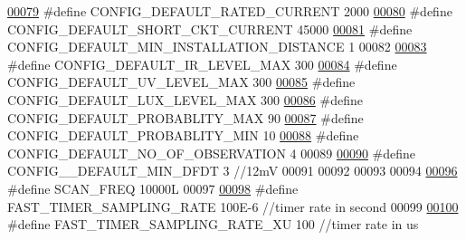\begin{DoxyCode}
\hypertarget{a00021_source_l00079}{}\hyperlink{a00021_ae329eb408f386777cbb443c27ca7c1c5}{00079} \textcolor{preprocessor}{#define CONFIG\_DEFAULT\_RATED\_CURRENT                            2000}
\hypertarget{a00021_source_l00080}{}\hyperlink{a00021_a9b142f2e7d26511af74c411c0e524384}{00080} \textcolor{preprocessor}{#define CONFIG\_DEFAULT\_SHORT\_CKT\_CURRENT                        45000}
\hypertarget{a00021_source_l00081}{}\hyperlink{a00021_aad4ef21bb535ed8bbba5a4f2d0451711}{00081} \textcolor{preprocessor}{#define CONFIG\_DEFAULT\_MIN\_INSTALLATION\_DISTANCE                1}
00082 
\hypertarget{a00021_source_l00083}{}\hyperlink{a00021_adf882de105367de21f0cbfe4490a046f}{00083} \textcolor{preprocessor}{#define CONFIG\_DEFAULT\_IR\_LEVEL\_MAX                             300}
\hypertarget{a00021_source_l00084}{}\hyperlink{a00021_a29f761c18bae89d087200e4f1891c651}{00084} \textcolor{preprocessor}{#define CONFIG\_DEFAULT\_UV\_LEVEL\_MAX                             300}
\hypertarget{a00021_source_l00085}{}\hyperlink{a00021_a04ab25767fbb61ec61784da889ec8c09}{00085} \textcolor{preprocessor}{#define CONFIG\_DEFAULT\_LUX\_LEVEL\_MAX                            300}
\hypertarget{a00021_source_l00086}{}\hyperlink{a00021_a96cf926b530a1d5968881620d2f10445}{00086} \textcolor{preprocessor}{#define CONFIG\_DEFAULT\_PROBABLITY\_MAX                           90}
\hypertarget{a00021_source_l00087}{}\hyperlink{a00021_a599be42d4b357badb7c9b16a124a186a}{00087} \textcolor{preprocessor}{#define CONFIG\_DEFAULT\_PROBABLITY\_MIN                           10}
\hypertarget{a00021_source_l00088}{}\hyperlink{a00021_af69b35a9f07bfcfe500538565d898c65}{00088} \textcolor{preprocessor}{#define CONFIG\_DEFAULT\_NO\_OF\_OBSERVATION                        4}
00089 
\hypertarget{a00021_source_l00090}{}\hyperlink{a00021_a0eae7c540b766617bb00f79cd63415a2}{00090} \textcolor{preprocessor}{#define CONFIG\_\_DEFAULT\_MIN\_DFDT                                3     //12mV}
00091 
00092 
00093 
00094 
\hypertarget{a00021_source_l00096}{}\hyperlink{a00021_a8127170b687c1f67a968886c128e76e4}{00096} \textcolor{preprocessor}{#define SCAN\_FREQ                                               10000L}
00097 
\hypertarget{a00021_source_l00098}{}\hyperlink{a00021_a3a4dcb8af26a561d90607a41a3745806}{00098} \textcolor{preprocessor}{#define FAST\_TIMER\_SAMPLING\_RATE                                100E-6        //timer rate in second}
00099 
\hypertarget{a00021_source_l00100}{}\hyperlink{a00021_a87ea9a0eaa474d8b8f672cfa5cbb091f}{00100} \textcolor{preprocessor}{#define FAST\_TIMER\_SAMPLING\_RATE\_XU                             100           //timer rate in us}

\end{DoxyCode}
